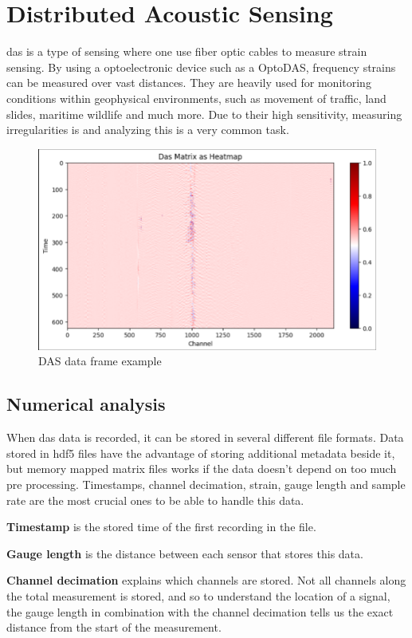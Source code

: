 \section{Distributed Acoustic Sensing}
\label{back:das}

\acrfull{das} is a type of sensing where one use fiber optic cables to measure strain sensing. By using a optoelectronic device such as a OptoDAS, frequency strains can be measured over vast distances. They are heavily used for monitoring conditions within geophysical environments, such as movement of traffic, land slides, maritime wildlife and much more. Due to their high sensitivity, measuring irregularities is and analyzing this is a very common task. 

\begin{figure}[!h]
    \centering
    \includegraphics[width=0.7\linewidth]{figures/das_example.png}
    \caption{DAS data frame example}
    \label{fig:dasframe-ex}
\end{figure}

\subsection{Numerical analysis}

When \acrshort{das} data is recorded, it can be stored in several different file formats. Data stored in \acrshort{hdf5} files have the advantage of storing additional metadata beside it, but memory mapped matrix files works if the data doesn't depend on too much pre processing. Timestamps, channel decimation, strain, gauge length and sample rate are the most crucial ones to be able to handle this data. 

\textbf{Timestamp} is the stored time of the first recording in the file.

\textbf{Gauge length} is the distance between each sensor that stores this data.

\textbf{Channel decimation} explains which channels are stored. Not all channels along the total measurement is stored, and so to understand the location of a signal, the gauge length in combination with the channel decimation tells us the exact distance from the start of the measurement.

